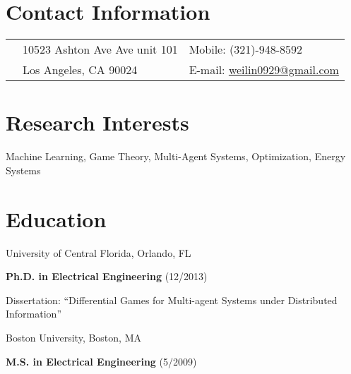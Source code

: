 \documentclass[margin,line]{res}
\newenvironment{list1}{
  \begin{list}{\ding{113}}{%
      \setlength{\itemsep}{0in}
      \setlength{\parsep}{0in} \setlength{\parskip}{0in}
      \setlength{\topsep}{0in} \setlength{\partopsep}{0in} 
      \setlength{\leftmargin}{0.17in}}}{\end{list}}
\begin{document}

\begin{resume}
\thispagestyle{plain} %

\section{\sc Contact Information}
\vspace{.05in}
\begin{tabular}{@{}p{0.20in}p{2.75in}p{2.75in}}
 & 10523 Ashton Ave Ave unit 101             & Mobile: (321)-948-8592 \\            
 & Los Angeles, CA 90024   & E-mail: \href{mailto: Your email}{ weilin0929@gmail.com} \\                
\end{tabular}


\section{\sc Research Interests}
\begin{list1}
\item[] Machine Learning, Game Theory, Multi-Agent Systems, Optimization, Energy Systems
\end{list1}

\section{\sc Education}
\begin{list1}
\item[] University of Central Florida, Orlando, FL\\
\vspace*{-.1in}
\begin{list1}
\item[] \textbf{Ph.D. in Electrical Engineering} (12/2013)
\item[] Dissertation: ``Differential Games for Multi-agent Systems under Distributed Information''
\vspace*{.1in}
\end{list1}

\item[] Boston University, Boston, MA
\begin{list1}
\item[] \textbf{M.S. in Electrical Engineering} (5/2009)
\vspace*{.1in}
\end{list1}


\end{list1}
\end{resume}
\end{document}

